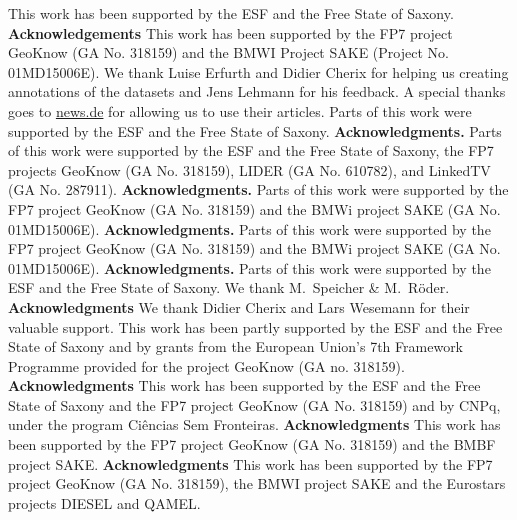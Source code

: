 This work has been supported by the ESF and the Free State of Saxony.
\textbf{Acknowledgements} This work has been supported by the FP7 project GeoKnow (GA No. 318159) and the BMWI Project SAKE (Project No. 01MD15006E).
We thank Luise Erfurth and Didier Cherix for helping us creating annotations of the datasets and Jens Lehmann for his feedback. A special thanks goes to \url{news.de} for allowing us to use their articles. Parts of this work were supported by the ESF and the Free State of Saxony.
\textbf{Acknowledgments.} Parts of this work were supported by the ESF and the Free State of Saxony, the FP7 projects GeoKnow (GA No. 318159), LIDER (GA No. 610782), and LinkedTV (GA No. 287911).
\textbf{Acknowledgments.} Parts of this work were supported by the FP7 project GeoKnow (GA No. 318159) and the BMWi project SAKE (GA No. 01MD15006E). 
\textbf{Acknowledgments.} Parts of this work were supported by the FP7 project GeoKnow (GA No. 318159) and the BMWi project SAKE (GA No. 01MD15006E). 
\textbf{Acknowledgments.} Parts of this work were supported by the ESF and the Free State of Saxony. We thank M.~Speicher \& M.~R\"oder.
\textbf{Acknowledgments} We thank Didier Cherix and Lars Wesemann for their valuable support. This work has been partly supported by the ESF and the Free State of Saxony and by grants from the European Union's 7th Framework Programme provided for the project GeoKnow (GA no. 318159).\\
\textbf{Acknowledgments}
This work has been supported by the ESF and the Free State of Saxony and the FP7 project GeoKnow (GA No. 318159) and by CNPq, under the program Ciências Sem Fronteiras.
\textbf{Acknowledgments}
This work has been supported by the FP7 project GeoKnow (GA No. 318159) and the BMBF project SAKE.
\textbf{Acknowledgments}
This work has been supported by the FP7 project GeoKnow (GA No. 318159), the BMWI project SAKE and the Eurostars projects DIESEL and QAMEL.

\endgroup



